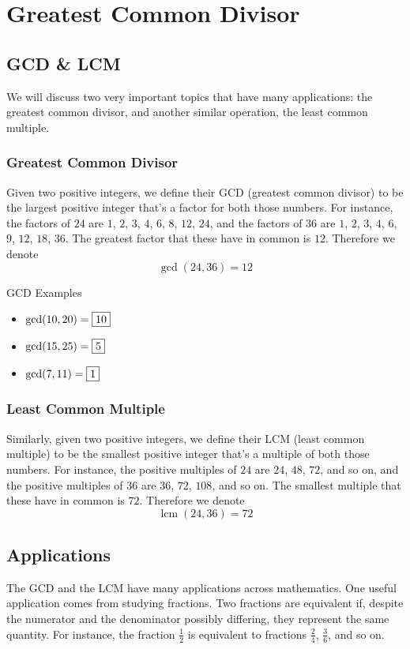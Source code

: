 \documentclass[a4paper,10pt]{report}
\begin{document}
\chapter{Greatest Common Divisor}

\section{GCD \& LCM}
We will discuss two very important topics that have many applications: the
greatest common divisor, and another similar operation, the least common
multiple.

\subsection{Greatest Common Divisor}
Given two positive integers, we define their GCD (greatest common divisor) to be
the largest positive integer that's a factor for both those numbers. For
instance, the factors of $24$ are $1$, $2$, $3$, $4$, $6$, $8$, $12$, $24$, and
the factors of $36$ are $1$, $2$, $3$, $4$, $6$, $9$, $12$, $18$, $36$. The
greatest factor that these have in common is $12$. Therefore we denote \[
 \gcd(24, 36) = 12
\]

\begin{problem}{GCD Examples}
 \begin{itemize}
  \item $\gcd(10, 20) = \Ans{10}$
  \item $\gcd(15, 25) = \Ans{5}$
  \item $\gcd(7, 11) = \Ans{1}$
 \end{itemize}
\end{problem}

\subsection{Least Common Multiple}
Similarly, given two positive integers, we define their LCM (least common
multiple) to be the smallest positive integer that's a multiple of both those
numbers. For instance, the positive multiples of $24$ are $24$, $48$, $72$, and
so on, and the positive multiples of $36$ are $36$, $72$, $108$, and so on.
The smallest multiple that these have in common is $72$. Therefore we
denote \[
 \operatorname{lcm}(24, 36) = 72
\]

\section{Applications}
The GCD and the LCM have many applications across mathematics. One useful
application comes from studying fractions. Two fractions are equivalent if,
despite the numerator and the denominator possibly differing, they represent
the same quantity. For instance, the fraction $\frac{1}{2}$ is equivalent to
fractions $\frac{2}{4}$, $\frac{3}{6}$, and so on.
\end{document}
